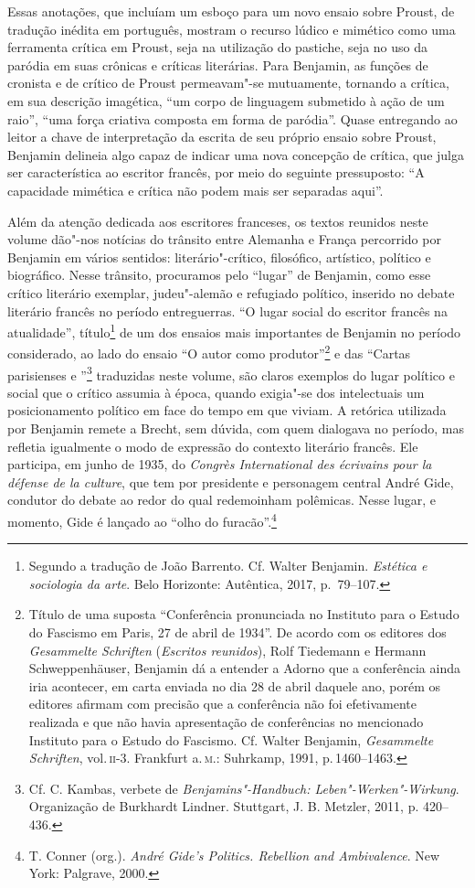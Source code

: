 Essas anotações, que incluíam um esboço para um novo ensaio sobre Proust, de tradução inédita em português, mostram o recurso lúdico e mimético como uma ferramenta crítica em Proust, seja na utilização do pastiche, seja no uso da paródia em suas crônicas e críticas literárias. Para Benjamin, as funções de cronista e de crítico de Proust permeavam"-se mutuamente, tornando a crítica, em sua descrição imagética, ``um corpo de linguagem submetido à ação de um raio'', ``uma força criativa composta em forma de paródia''. Quase entregando ao leitor a chave de interpretação da escrita de seu próprio ensaio sobre Proust, Benjamin delineia algo capaz de indicar uma nova concepção de crítica, que julga ser característica ao escritor francês, por meio do seguinte pressuposto: ``A capacidade mimética e crítica não podem mais ser separadas aqui''.

Além da atenção dedicada aos escritores franceses, os textos reunidos neste volume dão"-nos notícias do trânsito
entre Alemanha e França percorrido por Benjamin em vários sentidos:
literário"-crítico, filosófico, artístico, político e biográfico. Nesse trânsito, procuramos pelo ``lugar'' de Benjamin, como esse crítico literário exemplar,
judeu"-alemão e refugiado político, inserido no debate literário francês no período
entreguerras. ``O lugar social do escritor francês na atualidade'',
título\footnote{Segundo a tradução de João Barrento. Cf. Walter Benjamin. \textit{Estética e sociologia da arte}. Belo Horizonte: Autêntica,
  2017, p.~79--107.} de um dos ensaios mais importantes de Benjamin no
período considerado, ao lado do ensaio ``O autor como
produtor''\footnote{Título de uma suposta ``Conferência pronunciada no
  Instituto para o Estudo do Fascismo em Paris, 27 de abril de 1934''.
  De acordo com os editores dos \emph{Gesammelte Schriften} (\emph{Escritos reunidos}), Rolf Tiedemann e Hermann Schweppenhäuser,
  Benjamin dá a entender a Adorno que a conferência ainda iria
  acontecer, em carta enviada no dia 28 de abril daquele ano, porém os editores afirmam com
  precisão que a conferência não foi efetivamente realizada e que não
  havia apresentação de conferências no mencionado Instituto para o
  Estudo do Fascismo. Cf. Walter Benjamin, \emph{Gesammelte Schriften}, vol.\,\textsc{ii}-3. Frankfurt a.\,\textsc{m}.: Suhrkamp, 1991, p.\,1460--1463.} e das ``Cartas parisienses  e ''\footnote{Cf.
  C. Kambas, verbete de \emph{Benjamins"-Handbuch: Leben"-Werken"-Wirkung}. Organização de Burkhardt Lindner. Stuttgart, J. B. Metzler, 2011, p. 420--436.}
traduzidas neste volume, são claros exemplos do lugar político e social
que o crítico assumia à época, quando exigia"-se dos intelectuais um
posicionamento político em face do tempo em que viviam. A retórica utilizada por
Benjamin remete a Brecht, sem dúvida, com quem dialogava no período, mas
refletia igualmente o modo de expressão do contexto literário francês.
Ele participa, em junho de 1935, do \emph{Congrès International des
écrivains pour la défense de la culture}, que tem por presidente e
personagem central André Gide, condutor do debate ao redor do qual
redemoinham polêmicas. Nesse lugar, e momento, Gide é lançado ao ``olho do
furacão''.\footnote{T. Conner (org.). \emph{André Gide's Politics. Rebellion and
  Ambivalence}. New York: Palgrave, 2000.}

